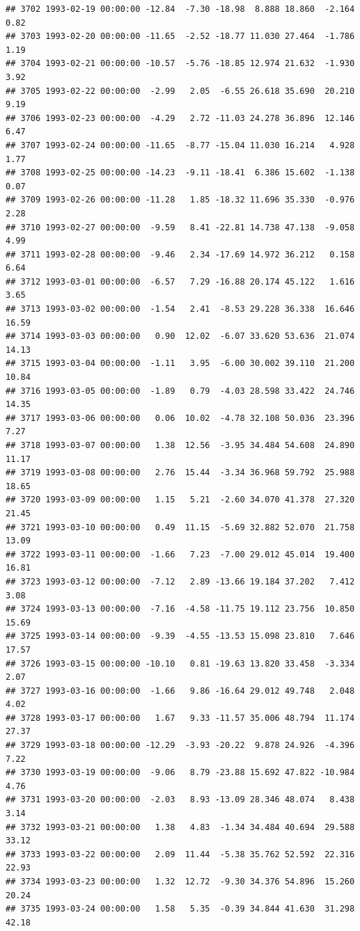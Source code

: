 \documentclass{article}\usepackage{graphicx, color}
\makeatletter
\newenvironment{kframe}{%
 \def\at@end@of@kframe{}%
 \ifinner\ifhmode%
  \def\at@end@of@kframe{\end{minipage}}%
  \begin{minipage}{\columnwidth}%
 \fi\fi%
 \def\FrameCommand##1{\hskip\@totalleftmargin \hskip-\fboxsep
 \colorbox{shadecolor}{##1}\hskip-\fboxsep
     \hskip-\linewidth \hskip-\@totalleftmargin \hskip\columnwidth}%
 \MakeFramed {\advance\hsize-\width
   \@totalleftmargin\z@ \linewidth\hsize
   \@setminipage}}%
 {\par\unskip\endMakeFramed%
 \at@end@of@kframe}
\newenvironment{knitrout}{}{} %
\makeatother
\begin{document}
\begin{knitrout}
\begin{kframe}
\begin{verbatim}
## 3702 1993-02-19 00:00:00 -12.84  -7.30 -18.98  8.888 18.860  -2.164   0.82
## 3703 1993-02-20 00:00:00 -11.65  -2.52 -18.77 11.030 27.464  -1.786   1.19
## 3704 1993-02-21 00:00:00 -10.57  -5.76 -18.85 12.974 21.632  -1.930   3.92
## 3705 1993-02-22 00:00:00  -2.99   2.05  -6.55 26.618 35.690  20.210   9.19
## 3706 1993-02-23 00:00:00  -4.29   2.72 -11.03 24.278 36.896  12.146   6.47
## 3707 1993-02-24 00:00:00 -11.65  -8.77 -15.04 11.030 16.214   4.928   1.77
## 3708 1993-02-25 00:00:00 -14.23  -9.11 -18.41  6.386 15.602  -1.138   0.07
## 3709 1993-02-26 00:00:00 -11.28   1.85 -18.32 11.696 35.330  -0.976   2.28
## 3710 1993-02-27 00:00:00  -9.59   8.41 -22.81 14.738 47.138  -9.058   4.99
## 3711 1993-02-28 00:00:00  -9.46   2.34 -17.69 14.972 36.212   0.158   6.64
## 3712 1993-03-01 00:00:00  -6.57   7.29 -16.88 20.174 45.122   1.616   3.65
## 3713 1993-03-02 00:00:00  -1.54   2.41  -8.53 29.228 36.338  16.646  16.59
## 3714 1993-03-03 00:00:00   0.90  12.02  -6.07 33.620 53.636  21.074  14.13
## 3715 1993-03-04 00:00:00  -1.11   3.95  -6.00 30.002 39.110  21.200  10.84
## 3716 1993-03-05 00:00:00  -1.89   0.79  -4.03 28.598 33.422  24.746  14.35
## 3717 1993-03-06 00:00:00   0.06  10.02  -4.78 32.108 50.036  23.396   7.27
## 3718 1993-03-07 00:00:00   1.38  12.56  -3.95 34.484 54.608  24.890  11.17
## 3719 1993-03-08 00:00:00   2.76  15.44  -3.34 36.968 59.792  25.988  18.65
## 3720 1993-03-09 00:00:00   1.15   5.21  -2.60 34.070 41.378  27.320  21.45
## 3721 1993-03-10 00:00:00   0.49  11.15  -5.69 32.882 52.070  21.758  13.09
## 3722 1993-03-11 00:00:00  -1.66   7.23  -7.00 29.012 45.014  19.400  16.81
## 3723 1993-03-12 00:00:00  -7.12   2.89 -13.66 19.184 37.202   7.412   3.08
## 3724 1993-03-13 00:00:00  -7.16  -4.58 -11.75 19.112 23.756  10.850  15.69
## 3725 1993-03-14 00:00:00  -9.39  -4.55 -13.53 15.098 23.810   7.646  17.57
## 3726 1993-03-15 00:00:00 -10.10   0.81 -19.63 13.820 33.458  -3.334   2.07
## 3727 1993-03-16 00:00:00  -1.66   9.86 -16.64 29.012 49.748   2.048   4.02
## 3728 1993-03-17 00:00:00   1.67   9.33 -11.57 35.006 48.794  11.174  27.37
## 3729 1993-03-18 00:00:00 -12.29  -3.93 -20.22  9.878 24.926  -4.396   7.22
## 3730 1993-03-19 00:00:00  -9.06   8.79 -23.88 15.692 47.822 -10.984   4.76
## 3731 1993-03-20 00:00:00  -2.03   8.93 -13.09 28.346 48.074   8.438   3.14
## 3732 1993-03-21 00:00:00   1.38   4.83  -1.34 34.484 40.694  29.588  33.12
## 3733 1993-03-22 00:00:00   2.09  11.44  -5.38 35.762 52.592  22.316  22.93
## 3734 1993-03-23 00:00:00   1.32  12.72  -9.30 34.376 54.896  15.260  20.24
## 3735 1993-03-24 00:00:00   1.58   5.35  -0.39 34.844 41.630  31.298  42.18

\end{verbatim}
\end{kframe}
\end{knitrout}
\end{document}
